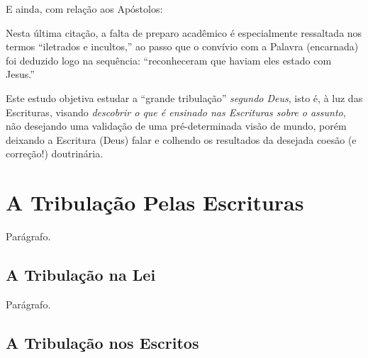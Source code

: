     E ainda, com relação aos Apóstolos:


    Nesta última citação, a falta de preparo acadêmico é especialmente ressaltada nos termos ``iletrados e incultos,'' ao  passo
    que o convívio com a Palavra (encarnada) foi deduzido logo na sequência: ``reconheceram que haviam eles estado com Jesus.''

    Este estudo objetiva  estudar  a  ``grande  tribulação''  \emph{segundo  Deus},  isto  é,  à  luz  das  Escrituras,  visando
    \emph{descobrir o que é ensinado nas Escrituras sobre o assunto}, não desejando uma validação de uma  pré-determinada  visão
    de mundo, porém deixando a Escritura (Deus) falar e colhendo os resultados da desejada coesão (e correção!) doutrinária.



\section{A Tribulação Pelas Escrituras}

    Parágrafo.

\subsection{A Tribulação na Lei}

    Parágrafo.

\subsection{A Tribulação nos Escritos}

